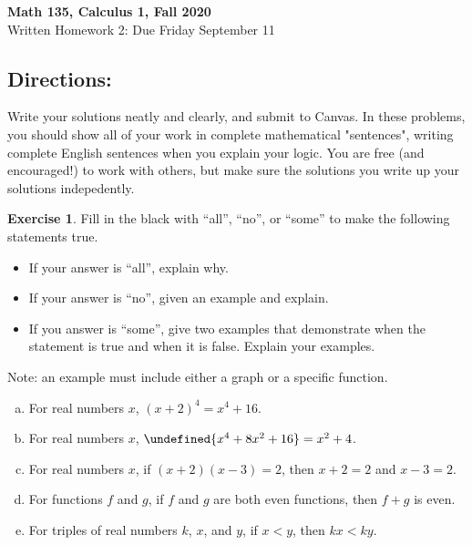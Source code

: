\documentclass[11pt,reqno,final]{amsart}
\makeatletter
\let\sqrt=\undefined
\DeclareRobustCommand\sqrt{\@ifnextchar[\@sqrt{\mathpalette\@x@sqrt}}
\def\@x@sqrt#1#2{%
 \setbox\z@\hbox{$\m@th#1\sqrtsign{\mkern1mu #2}$}
 \mkern3mu\box\z@}
\numberwithin{equation}{section}
\numberwithin{figure}{section}
\theoremstyle{definition} %
\newtheorem{exercise}[question]{Exercise}
\makeatother
\begin{document}
\begin{center}
        \textbf{\Large Math 135, Calculus 1, Fall 2020}\\[10pt]
        {\large Written Homework 2: Due Friday September 11}
\end{center}

\thispagestyle{empty}

\renewcommand{\thesection}{\Alph{section}}

\subsection*{Directions:}
Write your solutions neatly and clearly, and submit to Canvas.
In these problems, you should show all of your work in complete mathematical "sentences", writing complete English sentences when you explain your logic.
You are free (and encouraged!) to work with others, but make sure the solutions you write up your solutions indepedently.

\begin{exercise}
        Fill in the black with ``all'', ``no'', or ``some'' to make the following statements true.
        \begin{itemize}
        \item If your answer is ``all'', explain why.
        \item If your answer is ``no'', given an example and explain.
        \item If you answer is ``some'', give two examples that demonstrate when the statement is true and when it is false. Explain your examples.
        \end{itemize}
        Note: an example must include either a graph or a specific function.
        \begin{enumerate}[(a)]
        \item For \underline{\qquad} real numbers $x$, $(x+2)^4 = x^4 + 16$.
        \item For \underline{\qquad} real numbers $x$, $\sqrt{x^4+8x^2+16} = x^2 + 4$.
        \item For \underline{\qquad} real numbers $x$, if $(x+2)(x-3) = 2$, then $x+2 = 2$ and $x-3 = 2$.
        \item For \underline{\qquad} functions $f$ and $g$, if $f$ and $g$ are both even functions, then $f+g$ is even.
        \item For \underline{\qquad} triples of real numbers $k$, $x$, and $y$, if $x<y$, then $kx < ky$.
        \end{enumerate}
\end{exercise}
\end{document}
